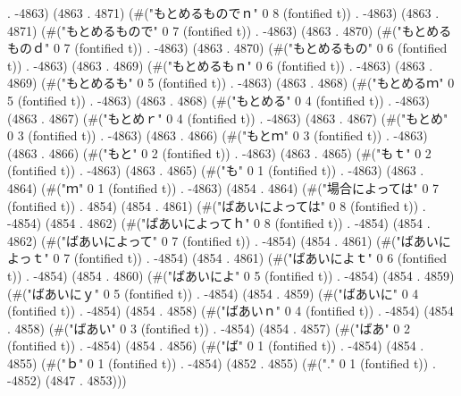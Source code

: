 . -4863) (4863 . 4871) (#("もとめるものでｎ" 0 8 (fontified t)) . -4863) (4863 . 4871) (#("もとめるもので" 0 7 (fontified t)) . -4863) (4863 . 4870) (#("もとめるものｄ" 0 7 (fontified t)) . -4863) (4863 . 4870) (#("もとめるもの" 0 6 (fontified t)) . -4863) (4863 . 4869) (#("もとめるもｎ" 0 6 (fontified t)) . -4863) (4863 . 4869) (#("もとめるも" 0 5 (fontified t)) . -4863) (4863 . 4868) (#("もとめるｍ" 0 5 (fontified t)) . -4863) (4863 . 4868) (#("もとめる" 0 4 (fontified t)) . -4863) (4863 . 4867) (#("もとめｒ" 0 4 (fontified t)) . -4863) (4863 . 4867) (#("もとめ" 0 3 (fontified t)) . -4863) (4863 . 4866) (#("もとｍ" 0 3 (fontified t)) . -4863) (4863 . 4866) (#("もと" 0 2 (fontified t)) . -4863) (4863 . 4865) (#("もｔ" 0 2 (fontified t)) . -4863) (4863 . 4865) (#("も" 0 1 (fontified t)) . -4863) (4863 . 4864) (#("ｍ" 0 1 (fontified t)) . -4863) (4854 . 4864) (#("場合によっては" 0 7 (fontified t)) . 4854) (4854 . 4861) (#("ばあいによっては" 0 8 (fontified t)) . -4854) (4854 . 4862) (#("ばあいによってｈ" 0 8 (fontified t)) . -4854) (4854 . 4862) (#("ばあいによって" 0 7 (fontified t)) . -4854) (4854 . 4861) (#("ばあいによっｔ" 0 7 (fontified t)) . -4854) (4854 . 4861) (#("ばあいによｔ" 0 6 (fontified t)) . -4854) (4854 . 4860) (#("ばあいによ" 0 5 (fontified t)) . -4854) (4854 . 4859) (#("ばあいにｙ" 0 5 (fontified t)) . -4854) (4854 . 4859) (#("ばあいに" 0 4 (fontified t)) . -4854) (4854 . 4858) (#("ばあいｎ" 0 4 (fontified t)) . -4854) (4854 . 4858) (#("ばあい" 0 3 (fontified t)) . -4854) (4854 . 4857) (#("ばあ" 0 2 (fontified t)) . -4854) (4854 . 4856) (#("ば" 0 1 (fontified t)) . -4854) (4854 . 4855) (#("ｂ" 0 1 (fontified t)) . -4854) (4852 . 4855) (#("." 0 1 (fontified t)) . -4852) (4847 . 4853)))
